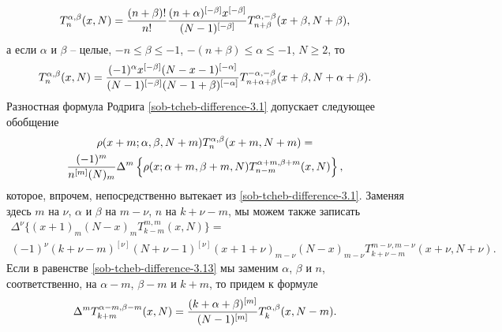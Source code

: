 \begin{equation}
T_n^{\alpha,\beta}(x,N)={(n+\beta)!\over n!}
{(n+\alpha)^{[-\beta]}x^{[-\beta]}\over (N-1)^{[-\beta]}}
T_{n+\beta}^{\alpha,-\beta}(x+\beta,N+\beta), \label{sob-tcheb-difference-3.14}
 \end{equation}
 а если $\alpha$ и $\beta$ -- целые, $-n\le\beta\le-1$, $-(n+\beta)\le\alpha\le-1$,
$N\ge2$, то
\begin{equation} T_n^{\alpha,\beta}(x,N)={(-1)^\alpha
x^{[-\beta]}(N-x-1)^{[-\alpha]}\over
(N-1)^{[-\beta]}(N-1+\beta)^{[-\alpha]}}
T_{n+\alpha+\beta}^{-\alpha,-\beta}(x+\beta,N+\alpha+\beta).
\label{sob-tcheb-difference-3.15}
\end{equation}
Разностная формула Родрига \eqref{sob-tcheb-difference-3.1} допускает следующее
обобщение
\begin{multline}
\rho(x+m;\alpha,\beta,N+m)T_n^{\alpha,\beta}(x+m,N+m)=\\
{(-1)^m\over n^{[m]}(N)_m}\Delta^m
\left\{\rho(x;\alpha+m,\beta+m,N)T_{n-m}^{\alpha+m,\beta+m}(x,N)\right\},\label{sob-tcheb-difference-3.16}
\end{multline}
 которое, впрочем, непосредственно вытекает из \eqref{sob-tcheb-difference-3.1}.
Заменяя здесь  $m$ на $\nu$,  $\alpha$ и $\beta$  на $m-\nu$, $n$ на
$k+\nu-m$, мы можем также записать
\begin{multline}
\Delta^\nu\{(x+1)_m(N-x)_mT_{k-m}^{m,m}(x,N)\}=\\
(-1)^\nu(k+\nu-m)^{[\nu]}(N+\nu-1)^{[\nu]}(x+1+\nu)_{m-\nu}(N-x)_{m-\nu}T_{k+\nu-m}^{m-\nu,m-\nu}(x+\nu,N+\nu).
\label{sob-tcheb-difference-3.17}
\end{multline}
 Если в равенстве \eqref{sob-tcheb-difference-3.13}  мы заменим $\alpha$, $\beta$ и $n$,
     соответственно, на   $\alpha-m$, $\beta-m$ и $k+m$, то придем
     к формуле
\begin{equation}
\Delta^m T_{k+m}^{\alpha-m,\beta-m}(x,N)={(k+\alpha+\beta)^{[m]}
\over (N-1)^{[m]}}T_k^{\alpha,\beta}(x,N-m).\label{sob-tcheb-difference-3.18}
\end{equation}

